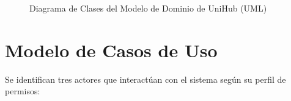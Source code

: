 \begin{figure}[htbp]
{%
    }
    \caption{Diagrama de Clases del Modelo de Dominio de UniHub (UML)}
    \label{fig:diagrama_dominio_uml}
\end{figure}

\section{Modelo de Casos de Uso}
Se identifican tres actores que interactúan con el sistema según su perfil de permisos:

